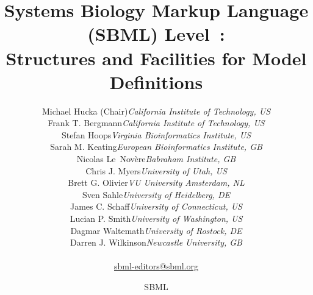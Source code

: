 
\title{Systems Biology Markup Language (SBML) Level~\sbmllevel:\\[-2pt]
  Structures and Facilities for Model Definitions}

\author{\begin{tabular}{l>{\hspace*{15pt}}r}
Michael Hucka (Chair)	& \emph{California Institute of Technology, US}\\
Frank T. Bergmann  	& \emph{California Institute of Technology, US}\\
Stefan Hoops		& \emph{Virginia Bioinformatics Institute, US}\\
Sarah M. Keating	& \emph{European Bioinformatics Institute, GB}\\
Nicolas Le~Nov\`{e}re	& \emph{Babraham Institute, GB}\\
Chris J. Myers		& \emph{University of Utah, US}\\
Brett G. Olivier	& \emph{VU University Amsterdam, NL}\\
Sven Sahle		& \emph{University of Heidelberg, DE}\\
James C. Schaff		& \emph{University of Connecticut, US}\\
Lucian P. Smith		& \emph{University of Washington, US}\\
Dagmar Waltemath	& \emph{University of Rostock, DE}\\
Darren J. Wilkinson	& \emph{Newcastle University, GB}\\[8pt]
\end{tabular}\\
\href{mailto:sbml-editors@sbml.org}{sbml-editors@sbml.org}}

\date{\vfill SBML \thisLV\\[5pt]\emph{\thisRelease}\\[20pt]
  \sbmldate}



\maketitle


